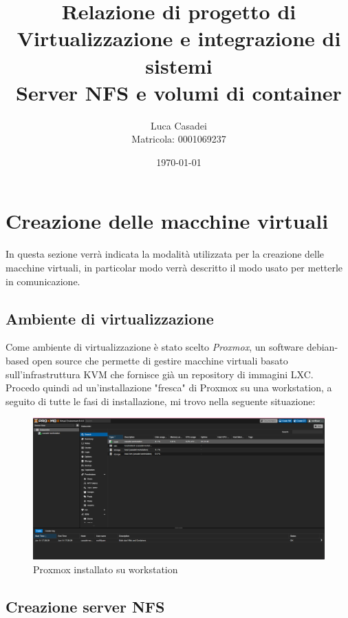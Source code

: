\documentclass[a4paper]{article}
\title{Relazione di progetto di Virtualizzazione e integrazione di sistemi\\
\textbf{Server NFS e volumi di container}}
\date{\today}
\author{Luca Casadei\\Matricola: 0001069237}
\begin{document}
\maketitle

\tableofcontents

\section{Creazione delle macchine virtuali}
In questa sezione verrà indicata la modalità utilizzata per la creazione delle macchine virtuali, 
in particolar modo verrà descritto il modo usato per metterle in comunicazione.
\subsection{Ambiente di virtualizzazione}
Come ambiente di virtualizzazione è stato scelto \textit{Proxmox}, un software debian-based open source che permette di gestire macchine virtuali basato
sull'infrastruttura \gls{KVM} che fornisce già un repository di immagini \gls{LXC}.
\\
Procedo quindi ad un'installazione "fresca" di Proxmox su una workstation, a seguito di tutte le fasi di installazione, mi trovo nella seguente situazione:
\begin{figure}[H]
    \centering
    \includegraphics[scale=0.22]{images/ProxMoxDopoInstallazione.png}
    \caption{Proxmox installato su workstation}
\end{figure}

\subsection{Creazione server NFS}
\end{document}
